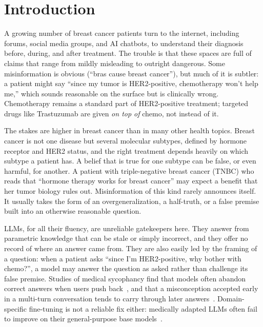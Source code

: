 \documentclass[10pt,a4paper]{article}
\begin{document}
\section{Introduction}

A growing number of breast cancer patients turn to the internet, including forums, social media groups, and AI chatbots, to understand their diagnosis before, during, and after treatment. The trouble is that these spaces are full of claims that range from mildly misleading to outright dangerous. Some misinformation is obvious (``bras cause breast cancer''), but much of it is subtler: a patient might say ``since my tumor is HER2-positive, chemotherapy won't help me,'' which sounds reasonable on the surface but is clinically wrong. Chemotherapy remains a standard part of HER2-positive treatment; targeted drugs like Trastuzumab are given \textit{on top of} chemo, not instead of it.

The stakes are higher in breast cancer than in many other health topics. Breast cancer is not one disease but several molecular subtypes, defined by hormone receptor and HER2 status, and the right treatment depends heavily on which subtype a patient has. A belief that is true for one subtype can be false, or even harmful, for another. A patient with triple-negative breast cancer (TNBC) who reads that ``hormone therapy works for breast cancer'' may expect a benefit that her tumor biology rules out. Misinformation of this kind rarely announces itself. It usually takes the form of an overgeneralization, a half-truth, or a false premise built into an otherwise reasonable question.

LLMs, for all their fluency, are unreliable gatekeepers here. They answer from parametric knowledge that can be stale or simply incorrect, and they offer no record of where an answer came from. They are also easily led by the framing of a question: when a patient asks ``since I'm HER2-positive, why bother with chemo?'', a model may answer the question as asked rather than challenge its false premise. Studies of medical sycophancy find that models often abandon correct answers when users push back~\cite{ping2026sycophancy}, and that a misconception accepted early in a multi-turn conversation tends to carry through later answers~\cite{munnangi2026threadmedqa}. Domain-specific fine-tuning is not a reliable fix either: medically adapted LLMs often fail to improve on their general-purpose base models~\cite{jeong2024limited}.
\end{document}
